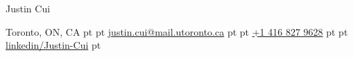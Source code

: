\documentclass[10pt, letterpaper]{article}
\newenvironment{header}{
    \setlength{\topsep}{0pt}\par\kern\topsep\centering\linespread{1.5}
}{
    \par\kern\topsep
}
\begin{document}
\begin{header}
    \fontsize{25 pt}{25 pt}\selectfont Justin Cui

    \vspace{1 pt}

    \normalsize
    Toronto, ON, CA%
     pt%
    \AND%
     pt%
    \href{mailto:justin.cui@mail.utoronto.ca}{justin.cui@mail.utoronto.ca}%
     pt%
    \AND%
     pt%
    \href{tel:+1-416-827-9628}{+1 416 827 9628}%
     pt%
    \AND%
     pt%
    \href{https://www.linkedin.com/in/justin-cui-b7b654181/}{linkedin/Justin-Cui}%
     pt%

\end{header}

\vspace{5 pt - 0.3 cm}
\end{document}
